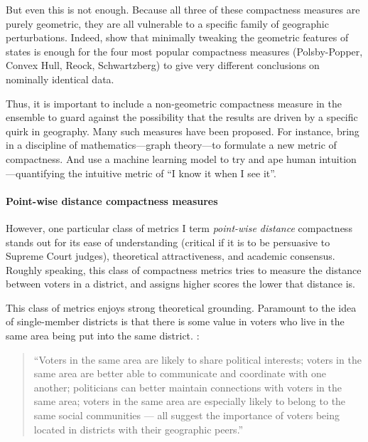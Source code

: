 \documentclass[]{article}
\let\oldparagraph\paragraph
\renewcommand{\paragraph}[1]{\oldparagraph{#1}\mbox{}}
\begin{document}
But even this is not enough. Because all three of these compactness
measures are purely geometric, they are all vulnerable to a specific
family of geographic perturbations. Indeed, \cite{bswp} show that
minimally tweaking the geometric features of states is enough for the
four most popular compactness measures (Polsby-Popper, Convex Hull,
Reock, Schwartzberg) to give very different conclusions on nominally
identical data.

Thus, it is important to include a non-geometric compactness measure in
the ensemble to guard against the possibility that the results are
driven by a specific quirk in geography. Many such measures have been
proposed. For instance, \cite{dc2016} bring in a discipline of
mathematics---graph theory---to formulate a new metric of compactness.
And \cite{kingwp} use a machine learning model to try and ape human
intuition---quantifying the intuitive metric of ``I know it when I see
it''.

\hypertarget{point-wise-distance-compactness-measures}{%
\paragraph{Point-wise distance compactness
measures}\label{point-wise-distance-compactness-measures}}

However, one particular class of metrics I term \emph{point-wise
distance} compactness stands out for its ease of understanding (critical
if it is to be persuasive to Supreme Court judges), theoretical
attractiveness, and academic consensus. Roughly speaking, this class of
compactness metrics tries to measure the distance between voters in a
district, and assigns higher scores the lower that distance is.

This class of metrics enjoys strong theoretical grounding. Paramount to
the idea of single-member districts is that there is some value in
voters who live in the same area being put into the same district.
\cite{er2019}:

\begin{quote}
``Voters in the same area are likely to share political interests;
voters in the same area are better able to communicate and coordinate
with one another; politicians can better maintain connections with
voters in the same area; voters in the same area are especially likely
to belong to the same social communities --- all suggest the importance
of voters being located in districts with their geographic peers.''
\end{quote}
\end{document}
